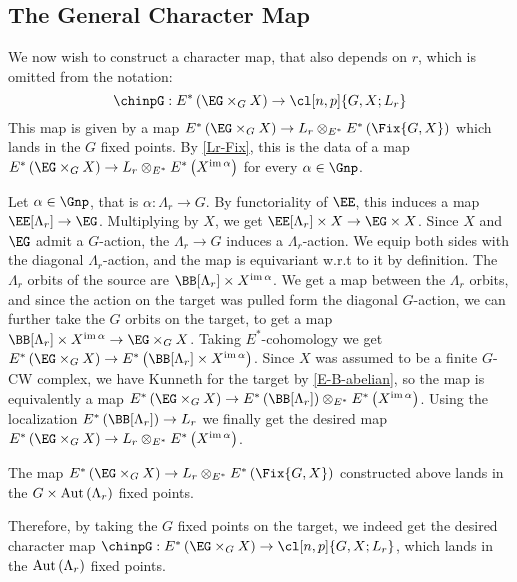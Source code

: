 \subsection{The General Character Map}

We now wish to construct a character map, that also depends on $r$, which is omitted from the notation:
$$\chinpG: E^*\left(\EG \times_G X\right) \to \cl[n,p]{G,X; L_r}$$
This map is given by a map $E^*\left(\EG \times_G X\right) \to L_r \otimes_{E^*} E^*\left(\Fix{G,X}\right)$ which lands in the $G$ fixed points.
By \ref{Lr-Fix}, this is the data of a map $E^*\left(\EG \times_G X\right) \to L_r \otimes_{E^*} E^*\left(X^{\im \alpha}\right)$ for every $\alpha \in \Gnp$.

Let $\alpha \in \Gnp$, that is $\alpha: \Lambda_r \to G$.
By functoriality of $\EE$, this induces a map $\EE[\Lambda_r] \to \EG$.
Multiplying by $X$, we get $\EE[\Lambda_r] \times X \to \EG \times X$.
Since $X$ and $\EG$ admit a $G$-action, the $\Lambda_r \to G$ induces a $\Lambda_r$-action.
We equip both sides with the diagonal $\Lambda_r$-action, and the map is equivariant w.r.t to it by definition.
The $\Lambda_r$ orbits of the source are $\BB[\Lambda_r] \times X^{\im \alpha}$. 
We get a map between the $\Lambda_r$ orbits, and since the action on the target was pulled form the diagonal $G$-action, we can further take the $G$ orbits on the target, to get a map $\BB[\Lambda_r] \times X^{\im \alpha} \to \EG \times_G X$.
Taking $E^*$-cohomology we get $E^*\left(\EG \times_G X\right) \to E^*\left(\BB[\Lambda_r] \times X^{\im \alpha}\right)$.
Since $X$ was assumed to be a finite $G$-CW complex, we have Kunneth for the target by \ref{E-B-abelian}, so the map is equivalently a map $E^*\left(\EG \times_G X\right) \to E^*\left(\BB[\Lambda_r]\right) \otimes_{E^*} E^*\left(X^{\im \alpha}\right)$.
Using the localization $E^*\left(\BB[\Lambda_r]\right) \to L_r$ we finally get the desired map $E^*\left(\EG \times_G X\right) \to L_r \otimes_{E^*} E^*\left(X^{\im \alpha}\right)$.

\begin{proposition}
	The map $E^*\left(\EG \times_G X\right) \to L_r \otimes_{E^*} E^*\left(\Fix{G,X}\right)$ constructed above lands in the $G \times \operatorname{Aut} \left(\Lambda_r\right)$ fixed points.
\end{proposition}

Therefore, by taking the $G$ fixed points on the target, we indeed get the desired character map $\chinpG: E^*\left(\EG \times_G X\right) \to \cl[n,p]{G,X; L_r}$, which lands in the $\operatorname{Aut} \left(\Lambda_r\right)$ fixed points.

